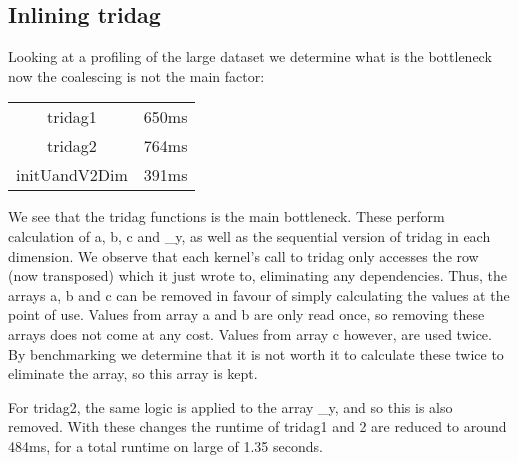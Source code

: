 \subsection{Inlining tridag}
Looking at a profiling of the large dataset we determine what is the bottleneck now the coalescing is not the main factor:

\begin{tabular}{c|c}
    tridag1 & 650ms\\
    tridag2 & 764ms\\
    initUandV2Dim & 391ms
\end{tabular}

We see that the tridag functions is the main bottleneck. These perform calculation of a, b, c and \_y, as well as the sequential version of tridag in each dimension. We observe that each kernel's call to tridag only accesses the row (now transposed) which it just wrote to, eliminating any dependencies. Thus, the arrays a, b and c can be removed in favour of simply calculating the values at the point of use. Values from array a and b are only read once, so removing these arrays does not come at any cost. Values from array c however, are used twice. By benchmarking we determine that it is not worth it to calculate these twice to eliminate the array, so this array is kept. 
\par For tridag2, the same logic is applied to the array \_y, and so this is also removed. With these changes the runtime of tridag1 and 2 are reduced to around 484ms, for a total runtime on large of 1.35 seconds.
